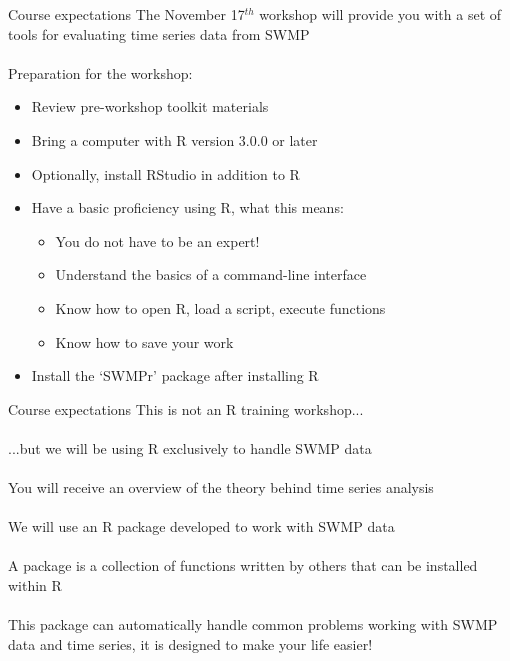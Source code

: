 \documentclass[xcolor=svgnames]{beamer}\usepackage[]{graphicx}\usepackage[]{color}
\begin{document}
\begin{frame}{Course expectations}
The November 17$^{th}$ workshop will provide you with a set of tools for evaluating time series data from SWMP \\~\\
Preparation for the workshop:
\begin{itemize}
\item Review pre-workshop toolkit materials
\item Bring a computer with R version 3.0.0 or later
\item Optionally, install RStudio in addition to R
\item Have a basic proficiency using R, what this means:
\begin{itemize}
\item You do not have to be an expert!
\item Understand the basics of a command-line interface
\item Know how to open R, load a script, execute functions
\item Know how to save your work 
\end{itemize}
\item Install the `SWMPr' package after installing R
\end{itemize}
\end{frame}

\begin{frame}{Course expectations}
This is not an R training workshop... \\~\\
...but we will be using R exclusively to handle SWMP data\\~\\
You will receive an overview of the theory behind time series analysis \\~\\
We will use an R package developed to work with SWMP data \\~\\
A package is a collection of functions written by others that can be installed within R\\~\\
This package can automatically handle common problems working with SWMP data and time series, it is designed to make your life easier! \\~\\
\end{frame}
\end{document}
